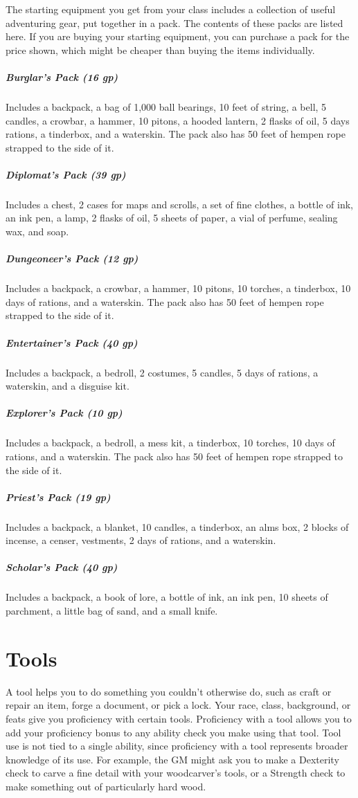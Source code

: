 The starting equipment you get from your class includes a collection of useful adventuring gear, put together in a pack. The contents of these packs are listed here. If you are buying your starting equipment, you can purchase a pack for the price shown, which might be cheaper than buying the items individually.

\subparagraph*{Burglar's Pack (16 gp)} Includes a backpack, a bag of 1,000 ball bearings, 10 feet of string, a bell, 5 candles, a crowbar, a hammer, 10 pitons, a hooded lantern, 2 flasks of oil, 5 days rations, a tinderbox, and a waterskin. The pack also has 50 feet of hempen rope strapped to the side of it.

\subparagraph*{Diplomat's Pack (39 gp)} Includes a chest, 2 cases for maps and scrolls, a set of fine clothes, a bottle of ink, an ink pen, a lamp, 2 flasks of oil, 5 sheets of paper, a vial of perfume, sealing wax, and soap.

\subparagraph*{Dungeoneer's Pack (12 gp)} Includes a backpack, a crowbar, a hammer, 10 pitons, 10 torches, a tinderbox, 10 days of rations, and a waterskin. The pack also has 50 feet of hempen rope strapped to the side of it.

\subparagraph*{Entertainer's Pack (40 gp)} Includes a backpack, a bedroll, 2 costumes, 5 candles, 5 days of rations, a waterskin, and a disguise kit.

\subparagraph*{Explorer's Pack (10 gp)} Includes a backpack, a bedroll, a mess kit, a tinderbox, 10 torches, 10 days of rations, and a waterskin. The pack also has 50 feet of hempen rope strapped to the side of it.

\subparagraph*{Priest's Pack (19 gp)} Includes a backpack, a blanket, 10 candles, a tinderbox, an alms box, 2 blocks of incense, a censer, vestments, 2 days of rations, and a waterskin.

\subparagraph*{Scholar's Pack (40 gp)} Includes a backpack, a book of lore, a bottle of ink, an ink pen, 10 sheets of parchment, a little bag of sand, and a small knife.

\section{Tools}

A tool helps you to do something you couldn't otherwise do, such as craft or repair an item, forge a document, or pick a lock. Your race, class, background, or feats give you proficiency with certain tools. Proficiency with a tool allows you to add your proficiency bonus to any ability check you make using that tool. Tool use is not tied to a single ability, since proficiency with a tool represents broader knowledge of its use. For example, the GM might ask you to make a Dexterity check to carve a fine detail with your woodcarver's tools, or a Strength check to make something out of particularly hard wood.


